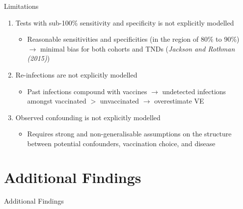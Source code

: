 \documentclass[aspectratio=169]{beamer}
\begin{document}
\begin{frame}{Limitations}
	\begin{enumerate}
		\item Tests with sub-100\% sensitivity and specificity is not explicitly modelled
		\begin{itemize}
			\item Reasonable sensitivities and specificities (in the region of 80\% to 90\%) $\rightarrow$ minimal bias for both cohorts and TNDs (\textit{Jackson and Rothman (2015)})
		\end{itemize}
		\item Re-infections are not explicitly modelled
		\begin{itemize}
			\item Past infections compound with vaccines $\rightarrow$ undetected infections amongst vaccinated $>$ unvaccinated $\rightarrow$ overestimate VE
		\end{itemize}
		\item Observed confounding is not explicitly modelled 
		\begin{itemize}
			\item Requires strong and non-generalisable assumptions on the structure between potential confounders, vaccination choice, and disease
		\end{itemize}
	\end{enumerate}
\end{frame}

\section{Additional Findings}
\begin{frame}{}
	\begin{block}{Additional Findings}
	\end{block}
\end{frame}
\end{document}
